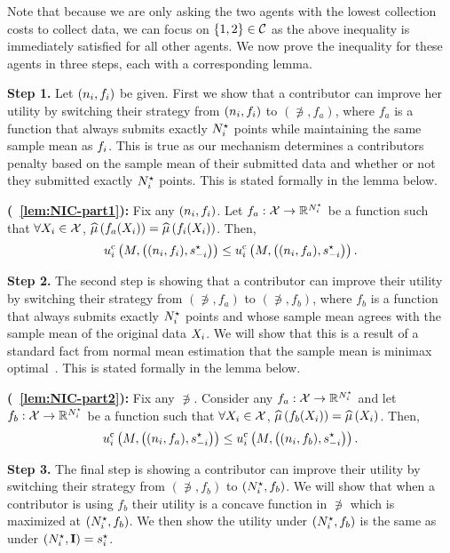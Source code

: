 Note that because we are only asking the two agents with the lowest collection costs to collect data, we can focus on $\left\{1,2\right\}\in\mathcal{C}$ as the above inequality is immediately satisfied for all other agents. We now prove the inequality for these agents in three steps, each with a corresponding lemma.

\textbf{Step 1.}
Let $(n_i,f_i)$ be given.
First we show that a contributor can improve her utility by switching their strategy from $(n_i,f_i)$ to $(\nni,f_a)$, where $f_a$ is a function that always submits exactly $N^\star_i$ points while maintaining the same sample mean as $f_i$. This is true as our mechanism determines a contributors penalty based on the sample mean of their submitted data and whether or not they submitted exactly $N^\star_i$ points. This is stated formally in the lemma below.

\textbf{(~\ref{lem:NIC-part1}):}
Fix any $(n_i,f_i)$. Let $f_a:\mathcal{X}\rightarrow\mathbb{R}^{N^\star_i}$ be a function such that $\forall X_{i}\in\mathcal{X}$, $\widehat{\mu}\left(f_a(X_{i})\right)=\widehat{\mu}\left(f_i(X_{i})\right)$. Then,
\begin{align*}
    u^{\rm c}_{i} \left(M, \left((n_i,f_i),s_{-i}^{\star} \right)\right)
    \leq
    u^{\rm c}_{i} \left(M, \left((n_i,f_a),s_{-i}^{\star} \right)\right) .
\end{align*}

\textbf{Step 2.} 
The second step is showing that a contributor can improve their utility by switching their strategy from $(\nni,f_a)$ to $(\nni,f_b)$, where $f_b$ is a function that always submits exactly $N^\star_i$ points and whose sample mean agrees with the sample mean of the original data $X_{i}$.
We will show that this is a result of a standard fact from normal mean estimation that the sample mean is minimax optimal~\citep{lehmann2006theory}. This is stated formally in the lemma below.

\textbf{(~\ref{lem:NIC-part2}):}
Fix any $\nni$. Consider any $f_a:\mathcal{X}\rightarrow\mathbb{R}^{N^\star_i}$ and let $f_b:\mathcal{X}\rightarrow\mathbb{R}^{N^\star_i}$ be a function such that 
$\forall X_{i}\in\mathcal{X}$, $\widehat{\mu}\left(f_b(X_{i})\right)=\widehat{\mu}\left(X_{i}\right)$. Then,
\begin{align*}
    u^{\rm c}_{i} \left(M, \left((n_i,f_a),s_{-i}^{\star} \right)\right)
    \leq
    u^{\rm c}_{i} \left(M, \left((n_i,f_b),s_{-i}^{\star} \right)\right) .
\end{align*}

\textbf{Step 3.}
The final step is showing a contributor can improve their utility by switching their strategy from $(\nni,f_b)$ to $(N^\star_i,f_b)$. We will show that when a contributor is using $f_b$ their utility is a concave function in $\nni$ which is maximized at $(N^\star_i,f_b)$. We then show the utility under $(N^\star_i,f_b)$ is the same as under $(N^\star_i,{\rm \bf I})=s_i^\star$.

